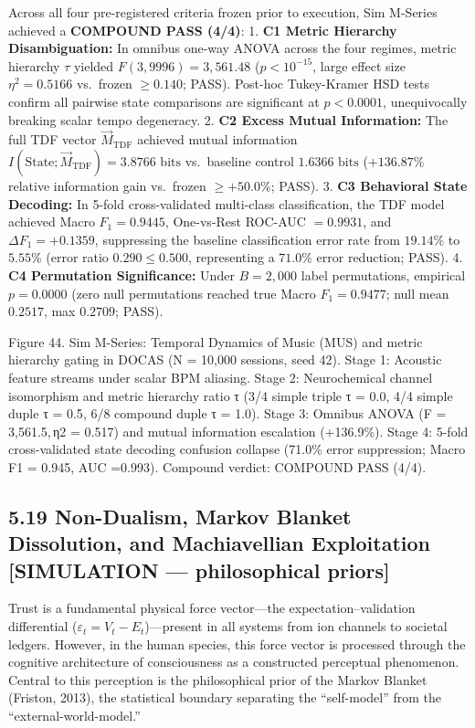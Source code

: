 \documentclass[
]{article}
\begin{document}
Across all four pre-registered criteria frozen prior to execution, Sim
M-Series achieved a \textbf{COMPOUND PASS (4/4)}: 1. \textbf{C1 Metric
Hierarchy Disambiguation:} In omnibus one-way ANOVA across the four
regimes, metric hierarchy \(\tau\) yielded \(F(3, 9996) = 3,561.48\)
(\(p < 10^{-15}\), large effect size \(\eta^2 = 0.5166\) vs.~frozen
\(\ge 0.140\); PASS). Post-hoc Tukey-Kramer HSD tests confirm all
pairwise state comparisons are significant at \(p < 0.0001\),
unequivocally breaking scalar tempo degeneracy. 2. \textbf{C2 Excess
Mutual Information:} The full TDF vector \(\vec{M}_{\text{TDF}}\)
achieved mutual information
\(I(\text{State}; \vec{M}_{\text{TDF}}) = 3.8766\text{ bits}\)
vs.~baseline control \(1.6366\text{ bits}\) (\(+136.87\%\) relative
information gain vs.~frozen \(\ge +50.0\%\); PASS). 3. \textbf{C3
Behavioral State Decoding:} In 5-fold cross-validated multi-class
classification, the TDF model achieved Macro \(F_1 = 0.9445\),
One-vs-Rest ROC-AUC \(= 0.9931\), and \(\Delta F_1 = +0.1359\),
suppressing the baseline classification error rate from \(19.14\%\) to
\(5.55\%\) (error ratio \(0.290 \le 0.500\), representing a \(71.0\%\)
error reduction; PASS). 4. \textbf{C4 Permutation Significance:} Under
\(B = 2,000\) label permutations, empirical \(p = 0.0000\) (zero null
permutations reached true Macro \(F_1 = 0.9477\); null mean \(0.2517\),
max \(0.2709\); PASS).

Figure 44. Sim M-Series: Temporal Dynamics of Music (MUS) and metric
hierarchy gating in DOCAS ({N = 10,000} sessions, seed 42). Stage 1:
Acoustic feature streams under scalar BPM aliasing. Stage 2:
Neurochemical channel isomorphism and metric hierarchy ratio {τ} ({3/4}
simple triple {τ = 0.0}, {4/4} simple duple {τ = 0.5}, {6/8} compound
duple {τ = 1.0}). Stage 3: Omnibus ANOVA ({F = 3,561.5, η2 = 0.517}) and
mutual information escalation ({+136.9\%}). Stage 4: 5-fold
cross-validated state decoding confusion collapse ({71.0\%} error
suppression; Macro {F1 = 0.945}, AUC {=0.993}). Compound verdict:
COMPOUND PASS (4/4).

\subsection{5.19 Non-Dualism, Markov Blanket Dissolution, and
Machiavellian Exploitation {[}SIMULATION --- philosophical
priors{]}}\label{non-dualism-markov-blanket-dissolution-and-machiavellian-exploitation-simulation-philosophical-priors}

Trust is a fundamental physical force vector---the
expectation--validation differential
(\(\varepsilon_t = V_t - E_t\))---present in all systems from ion
channels to societal ledgers. However, in the human species, this force
vector is processed through the cognitive architecture of consciousness
as a constructed perceptual phenomenon. Central to this perception is
the philosophical prior of the Markov Blanket (Friston, 2013), the
statistical boundary separating the ``self-model'' from the
``external-world-model.''
\end{document}
